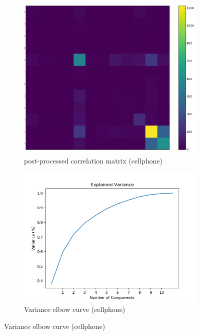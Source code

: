 \documentclass[20pt]{article} %
\begin{document}
\begin{figure}[!htbp]
  	\centering
   	\begin{subfigure}[p]{0.4\linewidth}
    	\includegraphics[width=\linewidth]{../figures/redo/cellphone/cp_covariance.png}
	\caption{post-processed correlation matrix (cellphone)}
   	\end{subfigure}
   	\begin{subfigure}[p]{0.4\linewidth}
    	\includegraphics[width=\linewidth]{../figures/redo/cellphone/cp_explained_variance.png}
	\caption{Variance elbow curve (cellphone)}
   	\end{subfigure}
\end{figure} 
\end{document}
